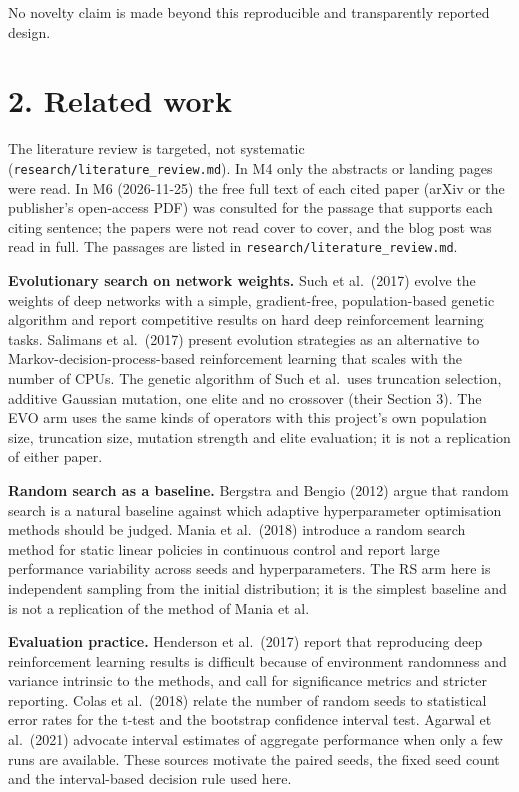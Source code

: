\documentclass[
]{article}
\begin{document}
No novelty claim is made beyond this reproducible and transparently
reported design.

\section{2. Related work}\label{related-work}

The literature review is targeted, not systematic
(\texttt{research/literature\_review.md}). In M4 only the abstracts or
landing pages were read. In M6 (2026-11-25) the free full text of each
cited paper (arXiv or the publisher's open-access PDF) was consulted for
the passage that supports each citing sentence; the papers were not read
cover to cover, and the blog post was read in full. The passages are
listed in \texttt{research/literature\_review.md}.

\textbf{Evolutionary search on network weights.} Such et al.~(2017)
evolve the weights of deep networks with a simple, gradient-free,
population-based genetic algorithm and report competitive results on
hard deep reinforcement learning tasks. Salimans et al.~(2017) present
evolution strategies as an alternative to Markov-decision-process-based
reinforcement learning that scales with the number of CPUs. The genetic
algorithm of Such et al.~uses truncation selection, additive Gaussian
mutation, one elite and no crossover (their Section 3). The EVO arm uses
the same kinds of operators with this project's own population size,
truncation size, mutation strength and elite evaluation; it is not a
replication of either paper.

\textbf{Random search as a baseline.} Bergstra and Bengio (2012) argue
that random search is a natural baseline against which adaptive
hyperparameter optimisation methods should be judged. Mania et
al.~(2018) introduce a random search method for static linear policies
in continuous control and report large performance variability across
seeds and hyperparameters. The RS arm here is independent sampling from
the initial distribution; it is the simplest baseline and is not a
replication of the method of Mania et al.

\textbf{Evaluation practice.} Henderson et al.~(2017) report that
reproducing deep reinforcement learning results is difficult because of
environment randomness and variance intrinsic to the methods, and call
for significance metrics and stricter reporting. Colas et al.~(2018)
relate the number of random seeds to statistical error rates for the
t-test and the bootstrap confidence interval test. Agarwal et al.~(2021)
advocate interval estimates of aggregate performance when only a few
runs are available. These sources motivate the paired seeds, the fixed
seed count and the interval-based decision rule used here.
\end{document}
